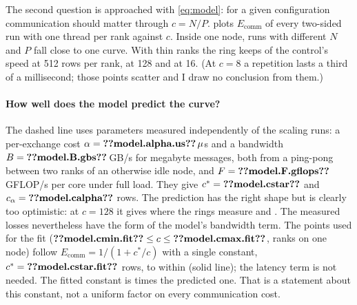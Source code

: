 The second question is approached with \cref{eq:model}: for a given configuration
communication should matter through $c=N/P$.  plots
$E_\text{comm}$ of every two-sided run with one thread per rank against $c$. Inside
one node, runs with different $N$ and $P$ fall close to one curve. With thin ranks
the ring keeps  of the control's speed at 512 rows per
rank,  at 128 and  at 16. (At $c=8$ a
repetition lasts a third of a millisecond; those points scatter and I draw no
conclusion from them.)

\paragraph{How well does the model predict the curve?} The dashed line uses
parameters measured independently of the scaling runs: a per-exchange cost
$\alpha=\n{model.alpha.us}\,\mu$s and a bandwidth $B=\n{model.B.gbs}$\,GB/s for
megabyte messages, both from a ping-pong between two ranks of an otherwise idle
node, and $F=\n{model.F.gflops}$\,GFLOP/s per core under full load. They give
$c^*=\n{model.cstar}$ and $c_\alpha=\n{model.calpha}$ rows. The prediction has the
right shape but is clearly too optimistic: at $c=128$ it gives 
where the rings measure  and .
The measured losses nevertheless have the form of the model's bandwidth term. The
 points used for the fit ($\n{model.cmin.fit}\le c\le\n{model.cmax.fit}$,
 ranks on one node) follow $E_\text{comm}=1/(1+c^*/c)$ with a
single constant, $c^*=\n{model.cstar.fit}$ rows, to within 
(solid line); the latency term is not needed. The fitted constant is
 times the predicted one. That is a statement about this
constant, not a uniform factor on every communication cost.

